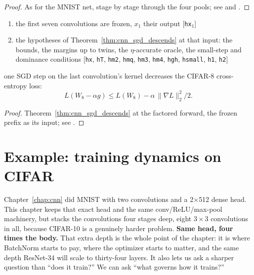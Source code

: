\begin{proof}
\leanok
As for the MNIST net, stage by stage through the four pools; see
 and
.
\end{proof}

\begin{theorem}
  \label{thm:cifar8_sgd_descends}
  \leanok
  \Assume{}
  \begin{enumerate}
    \item the first seven convolutions are frozen, \(x_1\) their output
          \hfill[\texttt{hx\(_1\)}]
    \item the hypotheses of Theorem~\ref{thm:cnn_sgd_descends} at that
          input: the bounds, the margins up to twins, the
          \(\eta\)-accurate oracle, the small-step and dominance conditions
          \hfill[\texttt{hx}, \texttt{hT}, \texttt{hm2}, \texttt{hmq}, \texttt{hm3}, \texttt{hm4}, \texttt{hgh}, \texttt{hsmall}, \texttt{h1}, \texttt{h2}]
  \end{enumerate}
  \Prove{} one SGD step on the last convolution's kernel decreases the
  CIFAR-8 cross-entropy loss:
  \[
    L(W_8 - \alpha g) \le L(W_8) - \alpha\,\|\nabla L\|_2^2/2 .
  \]
\end{theorem}

\begin{proof}
\leanok
Theorem~\ref{thm:cnn_sgd_descends} at the factored forward, the frozen
prefix as its input; see
.
\end{proof}

\section{Example: training dynamics on CIFAR}
\label{sec:bn_cifar_example}

Chapter~\ref{chap:cnn} did MNIST with two convolutions and a
2$\times$512 dense head. This chapter keeps that exact head and
the same conv/ReLU/max-pool machinery, but stacks the convolutions four
stages deep, eight $3 \times 3$ convolutions in all, because CIFAR-10 is
a genuinely harder problem. \textbf{Same head, four times
the body.} That extra depth is the whole point of the chapter: it is
where BatchNorm starts to pay, where the optimizer starts to matter,
and the same depth ResNet-34 will scale to thirty-four layers. It also
lets us ask a sharper question than ``does it train?'' We can ask
``what governs how it trains?''

